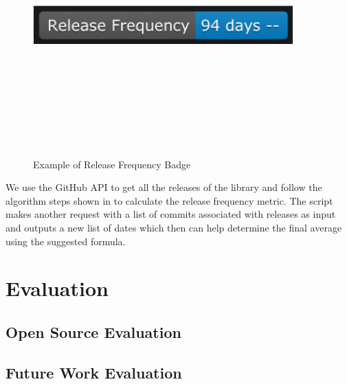 \documentclass[12pt, letterpaper]{article}
\begin{document}
\begin{figure}[!htb]
    \centerline{
        \includegraphics[width=10cm,height=10cm,keepaspectratio=true]{releasebadge}
    }
    \caption{
        Example of Release Frequency Badge
    }
    \label{releasebadge}
\end{figure}

We use the GitHub \cite{github} API to get all the releases of the library and follow the algorithm
steps shown in \cite{metrics} to calculate the release frequency metric.
The script makes another request with a list of commits associated with releases as input
and outputs a new list of dates which then can help determine the final average using the suggested
formula.




\section{Evaluation}

\subsection{Open Source Evaluation}
\subsection{Future Work Evaluation}
\end{document}
